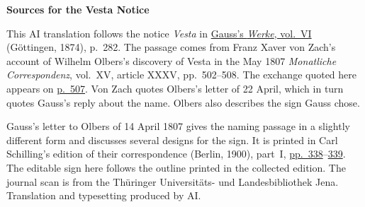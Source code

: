 \clearpage\thispagestyle{empty}
\begin{center}\textbf{Sources for the Vesta Notice}\end{center}
\noindent This AI translation follows the notice \emph{Vesta} in \href{https://gdz.sub.uni-goettingen.de/id/PPN236007467}{Gauss’s \textit{Werke}, vol.~VI} (Göttingen, 1874), p.~282. The passage comes from Franz Xaver von Zach’s account of Wilhelm Olbers’s discovery of Vesta in the May 1807 \textit{Monatliche Correspondenz}, vol.~XV, article XXXV, pp.~502--508. The exchange quoted here appears on \href{https://zs.thulb.uni-jena.de/rsc/viewer/jportal_derivate_00237836/Monatliche_Correspondenz_130168688_15_1807_0514.tif}{p.~507}. Von Zach quotes Olbers’s letter of 22 April, which in turn quotes Gauss’s reply about the name. Olbers also describes the sign Gauss chose.
\par\medskip
Gauss’s letter to Olbers of 14 April 1807 gives the naming passage in a slightly different form and discusses several designs for the sign. It is printed in Carl Schilling’s edition of their correspondence (Berlin, 1900), part~I, \href{https://archive.org/details/p1wilhelmolberss02olbeuoft/page/n351/mode/1up}{pp.~338}--\href{https://archive.org/details/p1wilhelmolberss02olbeuoft/page/n352/mode/1up}{339}. The editable sign here follows the outline printed in the collected edition. The journal scan is from the Thüringer Universitäts- und Landesbibliothek Jena. Translation and typesetting produced by AI.
\clearpage
